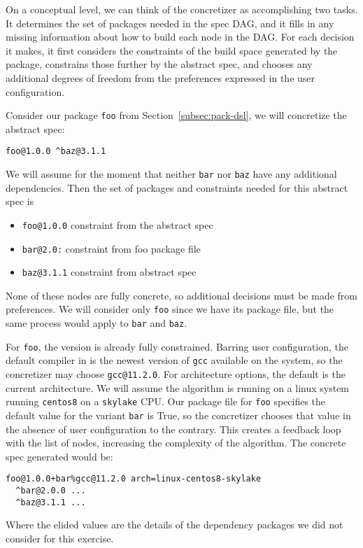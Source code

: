 On a conceptual level, we can think of the concretizer as accomplishing two tasks. It determines the set of packages needed in the spec DAG, and it fills in any missing information about how to build each node in the DAG. For each decision it makes, it first considers the constraints of the build space generated by the package, constrains those further by the abstract spec, and chooses any additional degrees of freedom from the preferences expressed in the user configuration.

Consider our package \texttt{foo} from Section~\ref{subsec:pack-dsl}, we will concretize the abstract spec:
\begin{verbatim}
foo@1.0.0 ^baz@3.1.1
\end{verbatim}
We will assume for the moment that neither \texttt{bar} nor \texttt{baz} have any additional dependencies. Then the set of packages and constraints needed for this abstract spec is

\begin{itemize}
\item \texttt{foo@1.0.0} constraint from the abstract spec \\
\item \texttt{bar@2.0:} constraint from foo package file \\
\item \texttt{baz@3.1.1} constraint from abstract spec \\
\end{itemize}

None of these nodes are fully concrete, so additional decisions must be made from preferences.
We will consider only \texttt{foo} since we have its package file, but the same process would apply to \texttt{bar} and \texttt{baz}.

For \texttt{foo}, the version is already fully constrained.
Barring user configuration, the default compiler in \spack{} is the newest version of \texttt{gcc} available on the system, so the concretizer may choose \texttt{gcc@11.2.0}.
For architecture options, the default is the current architecture. We will assume the algorithm is running on a linux system running \texttt{centos8} on a \texttt{skylake} CPU.
Our package file for \texttt{foo} specifies the default value for the variant \texttt{bar} is True, so the concretizer chooses that value in the absence of user configuration to the contrary.
This creates a feedback loop with the list of nodes, increasing the complexity of the algorithm.
The concrete spec generated would be:

\begin{verbatim}
foo@1.0.0+bar%gcc@11.2.0 arch=linux-centos8-skylake
  ^bar@2.0.0 ...
  ^baz@3.1.1 ...
\end{verbatim}

Where the elided values are the details of the dependency packages we did not consider for this exercise.
